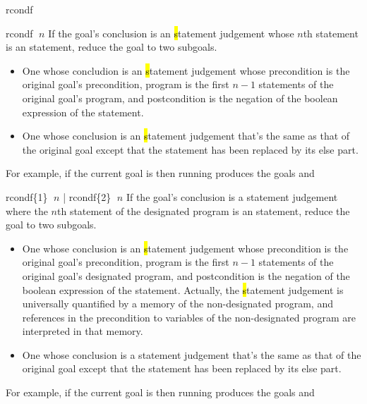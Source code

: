 \begin{tactic}{rcondf}
  \begin{tsyntax}{rcondf $\;n$}
    If the goal's conclusion is an \hl statement judgement whose $n$th
    statement is an  statement, reduce the goal to two
    subgoals.
    \begin{itemize}
    \item One whose concludion is an \hl statement judgement whose
      precondition is the original goal's precondition, program is the
      first $n-1$ statements of the original goal's program, and
      postcondition is the negation of the boolean expression of the
       statement.
   
    \item One whose conclusion is an \hl statement judgement that's
      the same as that of the original goal except that the 
      statement has been replaced by its else part.
    \end{itemize}

    \medskip For example, if the current goal is
     then
    running 
    produces the goals
     and
  \end{tsyntax}

  \begin{tsyntax}{rcondf\{1\} $\;n$ | rcondf\{2\} $\;n$}
    If the goal's conclusion is a \prhl statement judgement where the
    $n$th statement of the designated program is an  statement,
    reduce the goal to two subgoals.
    \begin{itemize}
    \item One whose conclusion is an \hl statement judgement whose
      precondition is the original goal's precondition, program is the
      first $n-1$ statements of the original goal's designated
      program, and postcondition is the negation of the boolean
      expression of the  statement. Actually, the \hl statement
      judgement is universally quantified by a memory of the
      non-designated program, and references in the precondition to
      variables of the non-designated program are interpreted in that
      memory.
   
    \item One whose conclusion is a \prhl statement judgement that's
      the same as that of the original goal except that the 
      statement has been replaced by its else part.
    \end{itemize}

  \medskip
  For example, if the current goal is
   then
  running 
  produces the goals
  and
  \end{tsyntax}
\end{tactic}
